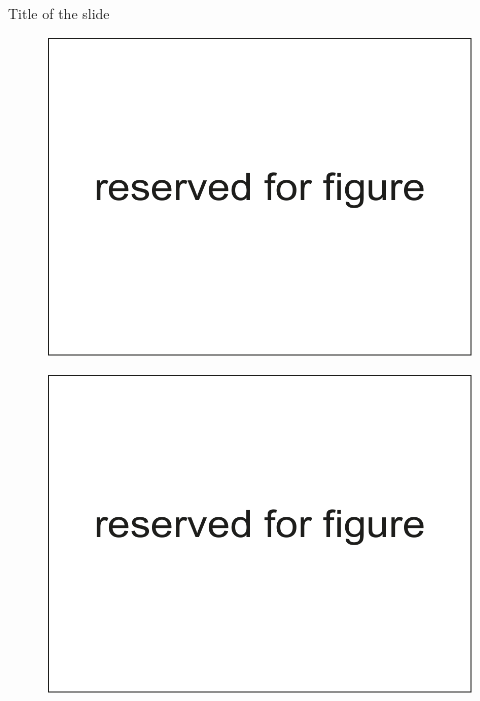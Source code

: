 \documentclass[russian,12pt,aspectratio=169,xcolor=table]{beamer}
\begin{document}
\begin{frame}{Title of the slide}
  \begin{minipage}{.49\textwidth}
    \begin{figure}
      \centering
      \includegraphics[width=\textwidth]{img/6}
    \end{figure}
  \end{minipage}\hfill 	
  \begin{minipage}{.49\textwidth}
    \begin{figure}
      \centering
      \includegraphics[width=\textwidth]{img/6}
    \end{figure}
  \end{minipage}
\end{frame}
\end{document}
